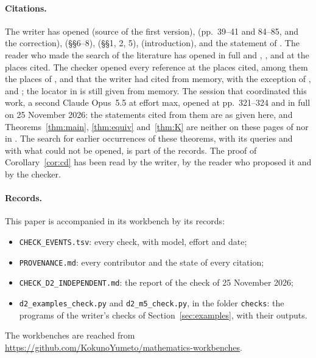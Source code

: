 \documentclass[11pt,a4paper]{article}
\theoremstyle{definition}
\begin{document}
\paragraph{Citations.} The writer has opened \cite{BB} (source of the first
version), \cite{Mi} (pp.~39--41 and 84--85, and the correction),
\cite{At} (\S\S6--8), \cite{Sw} (\S\S1, 2, 5), \cite{PW} (introduction),
\cite[Theorem~6.2]{CC} and
the statement of \cite[Proposition~4C.1]{Ha}. The reader who made the search of the
literature has opened \cite{Swan} in full and \cite{St}, \cite{MS},
\cite{GP} and \cite{GS} at the places cited. The checker opened every
reference at the places cited, among them the places of \cite[\S2]{At},
\cite{Ha} and \cite{Qu} that the writer had cited from memory, with the
exception of \cite{AH}, \cite{Fie} and \cite{McD}; the locator in
\cite{AH} is still given from memory. The session that coordinated this
work, a second Claude Opus~5.5 at effort max, opened \cite{Fie} at
pp.~321--324 and \cite{McD} in full on 25 November 2026: the statements
cited from them are as given here, and Theorems~\ref{thm:main},
\ref{thm:equiv} and~\ref{thm:K} are neither on these pages of \cite{Fie} nor
in \cite{McD}. The search for
earlier occurrences of these theorems, with its queries and with what could
not be opened, is part of the records. The proof of Corollary~\ref{cor:cd}
has been read by the writer, by the reader who proposed it and by the
checker.

\paragraph{Records.} This paper is accompanied in its workbench by its
records:
{\raggedright
\begin{itemize}
\item \texttt{CHECK\_EVENTS.tsv}: every check, with model, effort and date;
\item \texttt{PROVENANCE.md}: every contributor and the state of every
citation;
\item \texttt{CHECK\_D2\_INDEPENDENT.md}: the report of the check of 25
November 2026;
\item \texttt{d2\_examples\_check.py} and \texttt{d2\_m5\_check.py}, in the
folder \texttt{checks}: the programs of the writer's checks of
Section~\ref{sec:examples}, with their outputs.
\end{itemize}
\noindent The workbenches are reached from
\url{https://github.com/KokunoYumeto/mathematics-workbenches}.\par}
\end{document}
